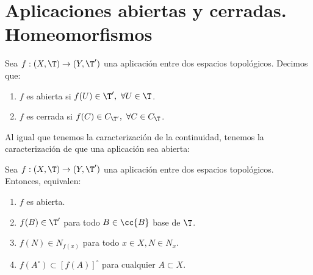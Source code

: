 \section{Aplicaciones abiertas y cerradas. Homeomorfismos}

\begin{definicion}
    Sea $f:(X,\T)\to (Y,\T')$ una aplicación entre dos espacios topológicos. Decimos que:
    \begin{enumerate}
        \item $f$ es abierta si $f(U)\in \T',~ \forall U\in \T$.
        \item $f$ es cerrada si $f(C)\in C_{\T'},~ \forall C\in C_\T$.
    \end{enumerate}
\end{definicion}

Al igual que tenemos la caracterización de la continuidad, tenemos la caracterización de que una aplicación sea abierta:
\begin{prop}
    Sea $f:(X,\T)\to (Y,\T')$ una aplicación entre dos espacios topológicos. Entonces, equivalen:
    \begin{enumerate}
        \item $f$ es abierta.
        \item $f(B)\in \T'$ para todo $B\in \cc{B}$ base de $\T$.
        \item $f(N)\in N_{f(x)}$ para todo $x\in X, N\in N_x$.
        \item $f(A^\circ)\subset [f(A)]^\circ$ para cualquier $A\subset X$.
    \end{enumerate}
\end{prop}
